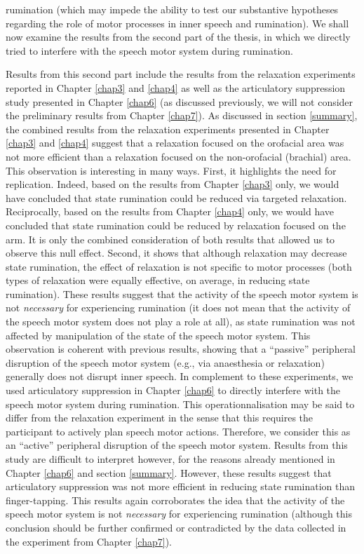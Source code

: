 \documentclass[a4paper,12pt,twoside,openright,oldfontcommands,final]{memoir}
\begin{document}
rumination (which may impede the ability to test our substantive hypotheses regarding the role of motor processes in inner speech and rumination). We shall now examine the results from the second part of the thesis, in which we directly tried to interfere with the speech motor system during rumination.

Results from this second part include the results from the relaxation experiments reported in Chapter \ref{chap3} and \ref{chap4} as well as the articulatory suppression study presented in Chapter \ref{chap6} (as discussed previously, we will not consider the preliminary results from Chapter \ref{chap7}). As discussed in section \ref{summary}, the combined results from the relaxation experiments presented in Chapter \ref{chap3} and \ref{chap4} suggest that a relaxation focused on the orofacial area was not more efficient than a relaxation focused on the non-orofacial (brachial) area. This observation is interesting in many ways. First, it highlights the need for replication. Indeed, based on the results from Chapter \ref{chap3} only, we would have concluded that state rumination could be reduced via targeted relaxation. Reciprocally, based on the results from Chapter \ref{chap4} only, we would have concluded that state rumination could be reduced by relaxation focused on the arm. It is only the combined consideration of both results that allowed us to observe this null effect. Second, it shows that although relaxation may decrease state rumination, the effect of relaxation is not specific to motor processes (both types of relaxation were equally effective, on average, in reducing state rumination). These results suggest that the activity of the speech motor system is not \emph{necessary} for experiencing rumination (it does not mean that the activity of the speech motor system does not play a role at all), as state rumination was not affected by manipulation of the state of the speech motor system. This observation is coherent with previous results, showing that a \enquote{passive} peripheral disruption of the speech motor system (e.g., via anaesthesia or relaxation) generally does not disrupt inner speech. In complement to these experiments, we used articulatory suppression in Chapter \ref{chap6} to directly interfere with the speech motor system during rumination. This operationnalisation may be said to differ from the relaxation experiment in the sense that this requires the participant to actively plan speech motor actions. Therefore, we consider this as an \enquote{active} peripheral disruption of the speech motor system. Results from this study are difficult to interpret however, for the reasons already mentioned in Chapter \ref{chap6} and section \ref{summary}. However, these results suggest that articulatory suppression was not more efficient in reducing state rumination than finger-tapping. This results again corroborates the idea that the activity of the speech motor system is not \emph{necessary} for experiencing rumination (although this conclusion should be further confirmed or contradicted by the data collected in the experiment from Chapter \ref{chap7}).
\end{document}
